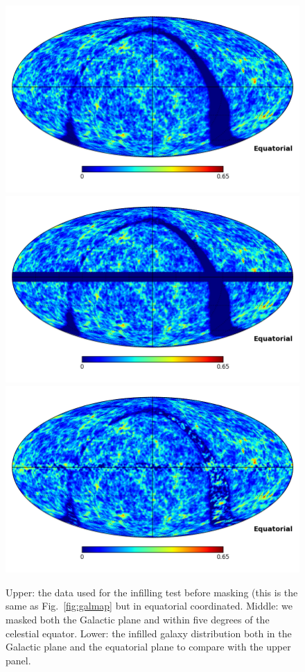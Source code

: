 \documentclass[useAMS,usenatbib]{mn2e}
\begin{document}
\begin{figure}
  \includegraphics[width=\columnwidth]{infill_test_dataC.png}
  \includegraphics[width=\columnwidth]{infill_test_maskeddataC.png}
  \includegraphics[width=\columnwidth]{infill_test_resultC.png}
  \caption{Upper: the data used for the infilling test before masking
    (this is the same as Fig.~\ref{fig:galmap} but in equatorial
    coordinated.  Middle: we masked both the Galactic plane and within
    five degrees of the celestial equator.  Lower: the infilled galaxy
    distribution both in the Galactic plane and the equatorial plane
    to compare with the upper panel.}
  \label{fig:infilling_test}
\end{figure}
\end{document}
